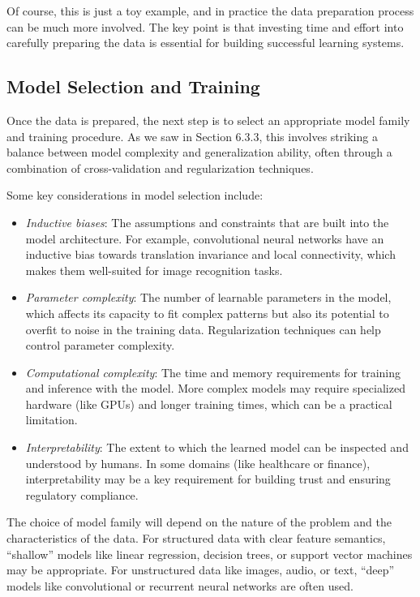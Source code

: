 \documentclass[
  9pt,
  letterpaper,
  abstract,
  titlepage]{scrbook}
\begin{document}
Of course, this is just a toy example, and in practice the data
preparation process can be much more involved. The key point is that
investing time and effort into carefully preparing the data is essential
for building successful learning systems.

\subsection{Model Selection and
Training}\label{model-selection-and-training}

Once the data is prepared, the next step is to select an appropriate
model family and training procedure. As we saw in Section 6.3.3, this
involves striking a balance between model complexity and generalization
ability, often through a combination of cross-validation and
regularization techniques.

Some key considerations in model selection include:

\begin{itemize}
\item
  \emph{Inductive biases}: The assumptions and constraints that are
  built into the model architecture. For example, convolutional neural
  networks have an inductive bias towards translation invariance and
  local connectivity, which makes them well-suited for image recognition
  tasks.
\item
  \emph{Parameter complexity}: The number of learnable parameters in the
  model, which affects its capacity to fit complex patterns but also its
  potential to overfit to noise in the training data. Regularization
  techniques can help control parameter complexity.
\item
  \emph{Computational complexity}: The time and memory requirements for
  training and inference with the model. More complex models may require
  specialized hardware (like GPUs) and longer training times, which can
  be a practical limitation.
\item
  \emph{Interpretability}: The extent to which the learned model can be
  inspected and understood by humans. In some domains (like healthcare
  or finance), interpretability may be a key requirement for building
  trust and ensuring regulatory compliance.
\end{itemize}

The choice of model family will depend on the nature of the problem and
the characteristics of the data. For structured data with clear feature
semantics, ``shallow'' models like linear regression, decision trees, or
support vector machines may be appropriate. For unstructured data like
images, audio, or text, ``deep'' models like convolutional or recurrent
neural networks are often used.
\end{document}
